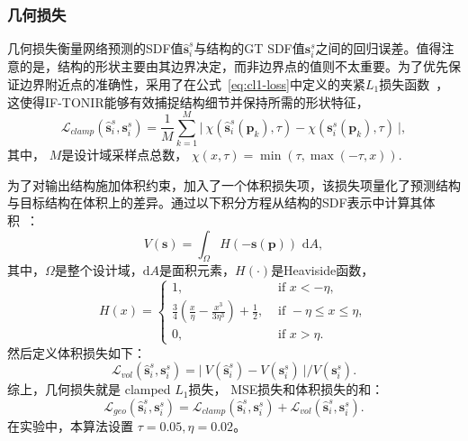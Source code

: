\subsubsection{几何损失}
几何损失衡量网络预测的SDF值$\hat{\mathbf{s}}^s_i$与结构的GT SDF值$\mathbf{s}^s_i$之间的回归误差。值得注意的是，结构的形状主要由其边界决定，而非边界点的值则不太重要。为了优先保证边界附近点的准确性，采用了在公式~\eqref{eq:cl1-loss}中定义的夹紧$L_1$损失函数~\cite{park2019deepsdf}，这使得IF-TONIR能够有效捕捉结构细节并保持所需的形状特征，
\begin{equation}
    \label{eq:cl1-loss}
    \mathcal{L}_{clamp}(\hat{\mathbf{s}}^s_i,\mathbf{s}_i^s)=\frac{1}{M}\sum_{k=1}^M\lvert~\chi (\hat{\mathbf{s}}^s_i(\mathbf{p}_k),\tau)-\chi (\mathbf{s}_i^s(\mathbf{p}_k),\tau)~\rvert,
\end{equation}
其中， $M$是设计域采样点总数， $\chi (x,\tau)=\min(\tau,\max(-\tau,x))$.

为了对输出结构施加体积约束，加入了一个体积损失项，该损失项量化了预测结构与目标结构在体积上的差异。通过以下积分方程从结构的SDF表示中计算其体积~\cite{van2012explicit}：
\begin{equation}
    V(\mathbf{s})=\int_{\Omega}H(-\mathbf{s}(\mathbf{p}))\,\,\mathrm{d}A,
\end{equation}
其中，$\Omega$是整个设计域，$\mathrm{d}A$是面积元素，$H(\cdot)$是Heaviside函数，
\begin{equation}
    H(x)=
    \begin{cases}1 ,\,\,                                                           & \textrm{if}\,\,  x< -\eta,            \\
             \frac{3}{4}(\frac{x}{\eta}-\frac{x^3}{3\eta^3})+\frac{1}{2}, \,\, & \textrm{if}\,\,  -\eta\leq x\leq\eta, \\
             0,\,\,                                                            & \textrm{if}\,\,  x>\eta.
    \end{cases}
\end{equation}
然后定义体积损失如下：
\begin{equation}
    \label{eq:vol-loss}
    \mathcal{L}_{vol}(\hat{\mathbf{s}}^s_i,\mathbf{s}_i^s)=\lvert~V(\hat{\mathbf{s}}^s_i)-V(\mathbf{s}_i^s)~\rvert /V(\mathbf{s}^s_i).
\end{equation}
综上，几何损失就是 clamped $L_1$损失， MSE损失和体积损失的和：
\begin{equation}
    \label{eq:geo-loss}
    \mathcal{L}_{geo}(\hat{\mathbf{s}}^s_i,\mathbf{s}_i^s)=\mathcal{L}_{clamp}(\hat{\mathbf{s}}^s_i,\mathbf{s}_i^s)+\mathcal{L}_{vol}(\hat{\mathbf{s}}^s_i,\mathbf{s}_i^s).
\end{equation}
在实验中，本算法设置 $\tau=0.05, \eta=0.02$。

